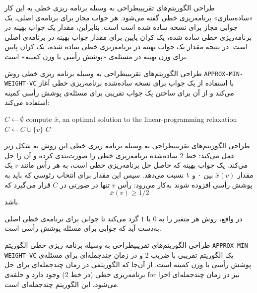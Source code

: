 \begin{itemframe-s}{طراحی الگوریتم‌های تقریبی}{طراحی به وسیله برنامه ریزی خطی}
\itm
به این کار «ساده‌سازی»
 برنامه‌ریزی خطی گفته می‌شود.
هر جواب مجاز برای برنامه‌ی اصلی، یک جوابی مجاز برای نسخه ساده شده است است.
\itm
بنابراین، مقدار یک جواب بهینه در برنامه‌ریزی خطی ساده شده، یک کران پایین برای مقدار جواب بهینه در برنامه‌ی اصلی است.
\itm
در نتیجه مقدار یک جواب بهینه در برنامه‌ریزی خطی ساده شده، یک کران پایین برای وزن بهینه در مسئله‌ی «پوشش رأسی با وزن کمینه»‌ است.
\end{itemframe-s}


\begin{itemframe-s}{طراحی الگوریتم‌های تقریبی}{طراحی به وسیله برنامه ریزی خطی}
\itm
روش
\texttt{APPROX-MIN-WEIGHT-VC}
 با استفاده از یک جواب برای نسخه ساده‌شده برنامه‌ریزی خطی آغاز می‌کند و از آن برای ساختن یک جواب تقریبی برای مسئله‌ی پوشش رأسی کمینه استفاده می‌کند:

\begin{algorithm}[H]\alglr
\caption{APPROX-MIN-WEIGHT-VC}
\begin{algorithmic}[1]
\State $C \gets \emptyset$
\State compute $\bar{x}$, an optimal solution to the linear-programming relaxation
        \State $C \gets C \cup \{v\}$
    \EndIf
\EndFor
\State \Return $C$
\end{algorithmic}
\end{algorithm}

\end{itemframe-s}


\begin{itemframe-s}{طراحی الگوریتم‌های تقریبی}{طراحی به وسیله برنامه ریزی خطی}
\itm
این روش به شکل زیر عمل می‌کند: خط 2 ساده‌شده برنامه‌ریزی خطی را صورت‌بندی کرده و آن را حل می‌کند. یک جواب بهینه که حاصل حل برنامه‌ریزی خطی است، به هر رأس مانند $v$ یک مقدار
$\bar{x}(v)$
بین ۰ و ۱ نسبت می‌دهد.
\itm
سپس این مقدار برای انتخاب رئوسی که باید به پوشش رأسی افزوده شوند به‌کار می‌رود: رأس $v$ تنها در صورتی در $C$ قرار می‌گیرد که
$$
\bar{x}(v) \geq 1/2
$$
باشد.

در واقع، روش هر متغیر را به $0$ یا $1$ گرد می‌کند تا جوابی برای برنامه‌ی خطی اصلی به‌دست آید که جوابی برای مسئله پوشش رأسی است.
\end{itemframe-s}


\begin{itemframe-s}{طراحی الگوریتم‌های تقریبی}{طراحی به وسیله برنامه ریزی خطی}
\itm
الگوریتم
\texttt{APPROX-MIN-WEIGHT-VC}
 یک الگوریتم تقریبی با ضریب 2 و در زمان چندجمله‌ای برای مسئله‌ی پوشش رأسی با وزن کمینه است.
\itm
از آن‌جا که الگوریتمی در زمان چندجمله‌ای برای حل برنامه‌ریزی خطی (در خط 2) وجود دارد و حلقه‌ی for نیز در زمان چندجمله‌ای اجرا می‌شود، این الگوریتم چندجمله‌ای است.
\end{itemframe-s}



